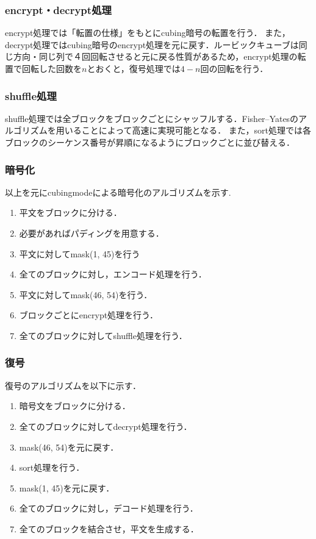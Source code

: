 \documentclass[a4j,titlepage]{jsarticle}
\begin{document}
\subsubsection{encrypt・decrypt処理}
encrypt処理では「転置の仕様」をもとにcubing暗号の転置を行う．
また，decrypt処理ではcubing暗号のencrypt処理を元に戻す．ルービックキューブは同じ方向・同じ列で４回回転させると元に戻る性質があるため，encrypt処理の転置で回転した回数を\(n\)とおくと，復号処理では\(4-n\)回の回転を行う．

\subsubsection{shuffle処理}
shuffle処理では全ブロックをブロックごとにシャッフルする．Fisher–Yatesのアルゴリズムを用いることによって高速に実現可能となる．
また，sort処理では各ブロックのシーケンス番号が昇順になるようにブロックごとに並び替える．

\subsubsection{暗号化}
以上を元にcubingmodeによる暗号化のアルゴリズムを示す. 
\begin{screen}
  \begin{enumerate}
    \item 平文をブロックに分ける．
    \item 必要があればパディングを用意する．
    \item 平文に対してmask(\phantom{0}1, 45)を行う
    \item 全てのブロックに対し，エンコード処理を行う．
    \item 平文に対してmask(46, 54)を行う．
    \item ブロックごとにencrypt処理を行う．
    \item 全てのブロックに対してshuffle処理を行う．
  \end{enumerate}
\end{screen}

\subsubsection{復号}
復号のアルゴリズムを以下に示す．
\begin{screen}
  \begin{enumerate}
    \item 暗号文をブロックに分ける．
    \item 全てのブロックに対してdecrypt処理を行う．
    \item mask(46, 54)を元に戻す．
    \item sort処理を行う．
    \item mask(\phantom{0}1, 45)を元に戻す．
    \item 全てのブロックに対し，デコード処理を行う．
    \item 全てのブロックを結合させ，平文を生成する．
  \end{enumerate}
\end{screen}
\end{document}
